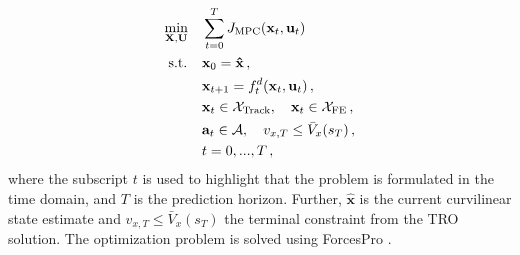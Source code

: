 \begin{equation}
\label{eq:MPC}
\begin{aligned}
& \underset{\mathbf{X}, \mathbf{U}}{\text{min}}
    && \sum_{t=0}^{T} J_{\rm{MPC}}(\mathbf{x}_t, \mathbf{u}_t) \\
& \; \text{s.t.}
    && \mathbf{x}_0 = \mathbf{\hat{x}}\,,\\
    &&& \mathbf{x}_{t+1} = f_t^d(\mathbf{x}_t, \mathbf{u}_t) \,,\\
&&& \mathbf{{x}}_t \in \mathcal{X}_{\text{Track}}, \quad \mathbf{{x}}_t \in \mathcal{X}_{\text{FE}} \,,\\
&&& \mathbf{a}_t \in \mathcal{A}, \quad v_{x,T} \leq \bar{V}_{x}(s_T)\,, \\
&&& t = 0,...,T\,,
\end{aligned}
\end{equation}
where the subscript $t$ is used to highlight that the problem is formulated in the time domain, and $T$ is the prediction horizon. Further, $\mathbf{\hat{x}}$ is the current curvilinear state estimate and $v_{x,T} \leq \bar{V}_{x}(s_T)$ the terminal constraint from the TRO solution. The optimization problem is solved using ForcesPro \cite{FORCESPro,FORCESNLP}.
